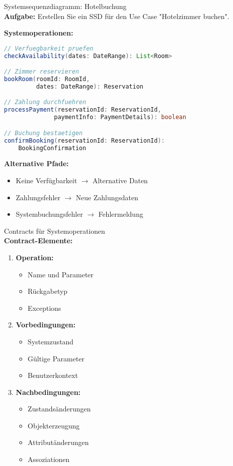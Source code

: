 \begin{example2}{Systemsequenzdiagramm: Hotelbuchung}\\
\textbf{Aufgabe:} Erstellen Sie ein SSD für den Use Case "Hotelzimmer buchen".

\textbf{Systemoperationen:}
\begin{lstlisting}[language=Java, style=base]
// Verfuegbarkeit pruefen
checkAvailability(dates: DateRange): List<Room>

// Zimmer reservieren
bookRoom(roomId: RoomId, 
         dates: DateRange): Reservation

// Zahlung durchfuehren
processPayment(reservationId: ReservationId,
              paymentInfo: PaymentDetails): boolean

// Buchung bestaetigen
confirmBooking(reservationId: ReservationId): 
    BookingConfirmation
\end{lstlisting}

\textbf{Alternative Pfade:}
\begin{itemize}
    \item Keine Verfügbarkeit $\rightarrow$ Alternative Daten
    \item Zahlungsfehler $\rightarrow$ Neue Zahlungsdaten
    \item Systembuchungsfehler $\rightarrow$ Fehlermeldung
\end{itemize}
\end{example2}

\begin{KR}{Contracts für Systemoperationen}\\
\textbf{Contract-Elemente:}
\begin{enumerate}
    \item \textbf{Operation:}
    \begin{itemize}
        \item Name und Parameter
        \item Rückgabetyp
        \item Exceptions
    \end{itemize}
    
    \item \textbf{Vorbedingungen:}
    \begin{itemize}
        \item Systemzustand
        \item Gültige Parameter
        \item Benutzerkontext
    \end{itemize}
    
    \item \textbf{Nachbedingungen:}
    \begin{itemize}
        \item Zustandsänderungen
        \item Objekterzeugung
        \item Attributänderungen
        \item Assoziationen
    \end{itemize}
\end{enumerate}
\end{KR}

